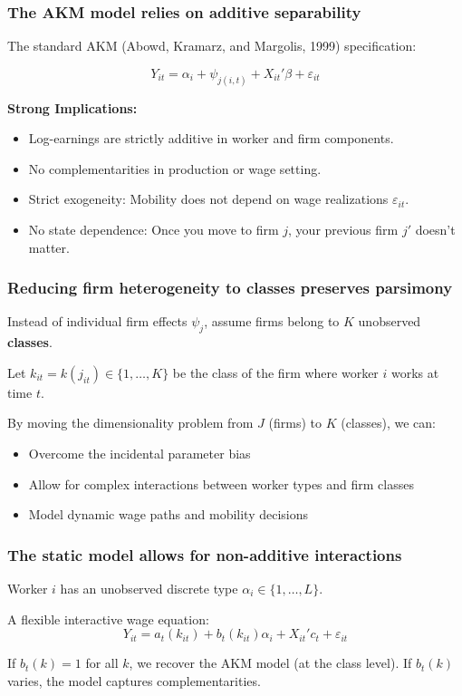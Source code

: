 \begin{frame}
    \frametitle{The AKM model relies on additive separability}
    
    The standard AKM (Abowd, Kramarz, and Margolis, 1999) specification:
    
    \[ Y_{it} = \alpha_i + \psi_{j(i,t)} + X_{it}'\beta + \varepsilon_{it} \]
    
    \vspace{0.5cm}
    \textbf{Strong Implications:}
    \begin{itemize}
        \item Log-earnings are strictly additive in worker and firm components.
        \item No complementarities in production or wage setting.
        \item Strict exogeneity: Mobility does not depend on wage realizations $\varepsilon_{it}$.
        \item No state dependence: Once you move to firm $j$, your previous firm $j'$ doesn't matter.
    \end{itemize}
\end{frame}

\begin{frame}
    \frametitle{Reducing firm heterogeneity to classes preserves parsimony}
    
    Instead of individual firm effects $\psi_j$, assume firms belong to $K$ unobserved \textbf{classes}.
    
    \vspace{0.5cm}
    Let $k_{it} = k(j_{it}) \in \{1, \dots, K\}$ be the class of the firm where worker $i$ works at time $t$.
    
    \vspace{0.5cm}
    By moving the dimensionality problem from $J$ (firms) to $K$ (classes), we can:
    \begin{itemize}
        \item Overcome the incidental parameter bias
        \item Allow for complex interactions between worker types and firm classes
        \item Model dynamic wage paths and mobility decisions
    \end{itemize}
\end{frame}

\begin{frame}
    \frametitle{The static model allows for non-additive interactions}
    
    Worker $i$ has an unobserved discrete type $\alpha_i \in \{1, \dots, L\}$.
    
    \vspace{0.5cm}
    A flexible interactive wage equation:
    \[ Y_{it} = a_t(k_{it}) + b_t(k_{it})\alpha_i + X_{it}'c_t + \varepsilon_{it} \]
    
    \vspace{0.5cm}
    If $b_t(k) = 1$ for all $k$, we recover the AKM model (at the class level). If $b_t(k)$ varies, the model captures complementarities.
\end{frame}

